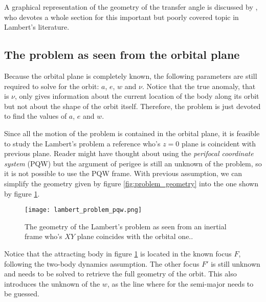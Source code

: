 A graphical representation of the geometry of the transfer angle is discussed by
\cite{der2011}, who devotes a whole section for this important but poorly
covered topic in Lambert's literature.

\subsection{The problem as seen from the orbital plane}

Because the orbital plane is completely known, the following parameters are
still required to solve for the orbit: $a$, $e$, $w$ and $\nu$. Notice that the
true anomaly, that is $\nu$, only gives information about the current location
of the body along its orbit but not about the shape of the orbit itself.
Therefore, the problem is just devoted to find the values of $a$, $e$ and $w$.

Since all the motion of the problem is contained in the orbital plane, it is
feasible to study the Lambert's problem a reference who's $z=0$ plane is
coincident with previous plane. Reader might have thought about using the
\textit{perifocal coordinate system} (PQW) but the argument of perigee is still
an unknown of the problem, so it is not possible to use the PQW frame. With
previous assumption, we can simplify the geometry given by figure
\ref{fig:problem_geometry} into the one shown by figure
\ref{fig:lambert_problem_pqw}.

\vspace{0.15cm}
\begin{figure}[H]
  \centering
  \texttt{[image: lambert\_problem\_pqw.png]}
  \caption{
    The geometry of the Lambert's problem as seen from an inertial frame who's
    $XY$ plane coincides with the orbital one..
  }
  \label{fig:lambert_problem_pqw}
\end{figure}

Notice that the attracting body in figure \ref{fig:lambert_problem_pqw} is
located in the known focus $F$, following the two-body dynamics assumption. The
other focus $F'$ is still unknown and needs to be solved to retrieve the full
geometry of the orbit. This also introduces the unknown of the $w$, as the line
where for the semi-major needs to be guessed.


